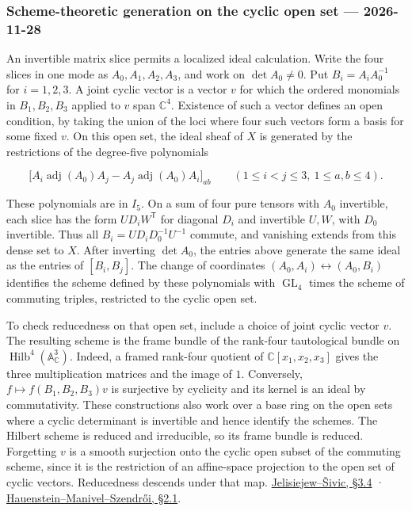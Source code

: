 \documentclass[11pt,a4paper]{article}
\begin{document}
\subsubsection{Scheme-theoretic generation on the cyclic open set ---
2026-11-28}\label{scheme-theoretic-generation-on-the-cyclic-open-set-2026-11-28}

An invertible matrix slice permits a localized ideal calculation. Write
the four slices in one mode as \(A_0,A_1,A_2,A_3\), and work on
\(\det A_0\ne0\). Put \(B_i=A_iA_0^{-1}\) for \(i=1,2,3\). A joint
cyclic vector is a vector \(v\) for which the ordered monomials in
\(B_1,B_2,B_3\) applied to \(v\) span \(\mathbb C^4\). Existence of such
a vector defines an open condition, by taking the union of the loci
where four such vectors form a basis for some fixed \(v\). On this open
set, the ideal sheaf of \(X\) is generated by the restrictions of the
degree-five polynomials

\[\big[A_i\mathop{\mathrm{adj}}\nolimits(A_0)A_j-A_j\mathop{\mathrm{adj}}\nolimits(A_0)A_i\big]_{ab}
\qquad (1\le i< j\le3,\ 1\le a,b\le4).\]

These polynomials are in \(I_5\). On a sum of four pure tensors with
\(A_0\) invertible, each slice has the form \(U D_i W^{\mathsf T}\) for
diagonal \(D_i\) and invertible \(U,W\), with \(D_0\) invertible. Thus
all \(B_i=U D_iD_0^{-1}U^{-1}\) commute, and vanishing extends from this
dense set to \(X\). After inverting \(\det A_0\), the entries above
generate the same ideal as the entries of \([B_i,B_j]\). The change of
coordinates \((A_0,A_i)\leftrightarrow(A_0,B_i)\) identifies the scheme
defined by these polynomials with \(\mathop{\mathrm{GL}}\nolimits_4\)
times the scheme of commuting triples, restricted to the cyclic open
set.

To check reducedness on that open set, include a choice of joint cyclic
vector \(v\). The resulting scheme is the frame bundle of the rank-four
tautological bundle on
\(\mathop{\mathrm{Hilb}}\nolimits^4(\mathbb A^3_{\mathbb C})\). Indeed,
a framed rank-four quotient of \(\mathbb C[x_1,x_2,x_3]\) gives the
three multiplication matrices and the image of \(1\). Conversely,
\(f\mapsto f(B_1,B_2,B_3)v\) is surjective by cyclicity and its kernel
is an ideal by commutativity. These constructions also work over a base
ring on the open sets where a cyclic determinant is invertible and hence
identify the schemes. The Hilbert scheme is reduced and irreducible, so
its frame bundle is reduced. Forgetting \(v\) is a smooth surjection
onto the cyclic open subset of the commuting scheme, since it is the
restriction of an affine-space projection to the open set of cyclic
vectors. Reducedness descends under that map.
\href{https://arxiv.org/abs/2106.13137}{Jelisiejew--Šivic, §3.4} ·
\href{https://academicweb.nd.edu/~jhauenst/preprints/hmsHilbertSchemes.pdf}{Hauenstein--Manivel--Szendrői,
§2.1}.
\end{document}
